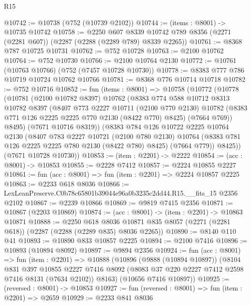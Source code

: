 \begin{lexlean}{R15}
\begin{coremodule}
@10742 := @10738 (@752 (@10739 @2102))
@10744 := (items : @8001) -> @10735 @10742
@10758 := @2250
    @607
    @8339
    @10742
    @789
    @8356
    (@2271 (@2281 @607))
    (@2287 (@2288 (@2289 @789) @8339 @2265))
@10761 := @8368 @787 @10725 @10731
@10762 := @752 @10728
@10763 := @2100 @10762
@10764 := @752 @10730
@10766 := @2100 @10764 @2130
@10772 := @10761 (@10763 @10766) (@752 (@7457 @10728 @10730))
@10778 := @8383 @777 @786 @10719 @10724 @10762 @10766
@10781 := @8368 @776 @10714 @10718
@10782 := @752 @10716
@10852 := fun (items : @8001) =>
  @10758
    (@10772
      (@10778
        (@10781
          (@2100 @10782 @8397)
          @10762
          (@8383
            @774
            @588
            @10712
            @8313
            @10782
            @8397
            (@8407
              @773
              @2227
              @10711
              (@2100 @770 @2130)
              @10782
              (@8383 @771 @126 @2225 @2225 @770 @2130 (@8422 @770) @8425)
              (@7664 @769))
            @8495)
          (@7671 @10716 @8319))
        (@8383
          @784
          @126
          @10722
          @2225
          @10764
          @2130
          (@8407
            @783
            @2227
            @10721
            (@2100 @780 @2130)
            @10764
            (@8383 @781 @126 @2225 @2225 @780 @2130 (@8422 @780) @8425)
            (@7664 @779))
          @8425))
      (@7671 @10728 @10730))
@10853 := (item : @2201) -> @2222
@10854 := (acc : @8001) -> @10853
@10855 := @2228 @7412
@10857 := @2224 @10855 @2227
@10861 := fun (acc : @8001) => fun (item : @2201) => @2224 @10857 @2225
@10863 := @2233 @618 @8036
@10866 := LexLeanPreserve.C0b78c65801b39044e96a0b3235c2dd44.R15.__fits_15 @2356 @2102
@10867 := @2239 @10866
@10869 := @9819 @7415 @2356
@10871 := @10867 (@2203 @10869)
@10874 := (acc : @8001) -> (item : @2201) -> @10863 @10871
@10888 := @2250
    @618
    @8036
    @10871
    @835
    @8057
    (@2271 (@2281 @618))
    (@2287 (@2288 (@2289 @835) @8036 @2265))
@10890 := @8140 @110 @41
@10893 := @10890 @833 @10857 @2225
@10894 := @2100 @7416
@10896 := @10893 (@10894 @8092)
@10897 := @9894 @2356
@10924 := fun (acc : @8001) =>
  fun (item : @2201) =>
  @10888
    (@10896
      (@9888 (@10894 @10897))
      (@8104
        @831
        @397
        @10855
        @2227
        @7416
        @8092
        (@8083 @37 @220 @2227 @7412 @2598 @7416 @8131 (@7634 @2102))
        @8163)
      (@10656 @7416 @10897))
@10925 := (reversed : @8001) -> @10853
@10927 := fun (reversed : @8001) => fun (item : @2201) => @2659
@10929 := @2233 @841 @8036

\end{coremodule}
\end{lexlean}
